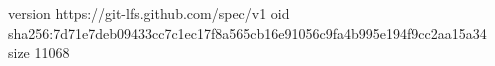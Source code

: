 version https://git-lfs.github.com/spec/v1
oid sha256:7d71e7deb09433cc7c1ec17f8a565cb16e91056c9fa4b995e194f9cc2aa15a34
size 11068
